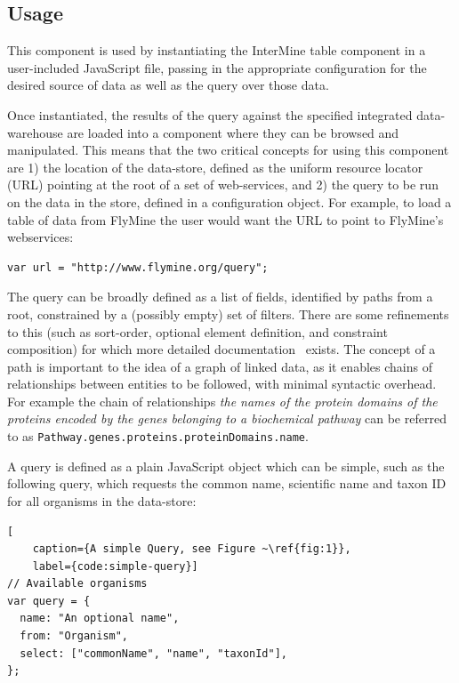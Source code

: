 \documentclass[10pt,a4paper,twocolumn]{article}
\begin{document}
\subsection*{Usage}

This component is used by instantiating the InterMine table component in a
user-included JavaScript file, passing in the appropriate configuration for the
desired source of data as well as the query over those data.

Once instantiated, the results of the query against the specified integrated
data-warehouse are loaded into a component where they can be browsed and
manipulated.  This means that the two critical concepts for using this component
are 1) the location of the data-store, defined as the uniform resource locator
(URL) pointing at the root of a set of web-services, and 2) the query to be run
on the data in the store, defined in a configuration object. For example, to
load a table of data from FlyMine the user would want the URL to point to
FlyMine's webservices:

\begin{lstlisting}[caption={Specifying the Data-Store}, label={code:set-url}]
var url = "http://www.flymine.org/query";
\end{lstlisting}

The query can be broadly defined as a list of fields, identified by paths from a
root, constrained by a (possibly empty) set of filters. There are some
refinements to this (such as sort-order, optional element definition, and
constraint composition) for which more detailed documentation~\cite{site:pqdocs}
exists. The concept of a path is important to the idea of a graph of linked
data, as it enables chains of relationships between entities to be followed,
with minimal syntactic overhead. For example the chain of relationships
\emph{the names of the protein domains of the proteins encoded by the genes
belonging to a biochemical pathway} can be referred to as
\texttt{Pathway.genes.proteins.proteinDomains.name}.

A query is defined as a plain JavaScript object which can be simple, such as the 
following query, which requests the common name, scientific name and
taxon ID for all organisms in the data-store:

\begin{lstlisting}[
    caption={A simple Query, see Figure ~\ref{fig:1}},
    label={code:simple-query}]
// Available organisms
var query = {
  name: "An optional name",
  from: "Organism",
  select: ["commonName", "name", "taxonId"],
};
\end{lstlisting}
\end{document}
